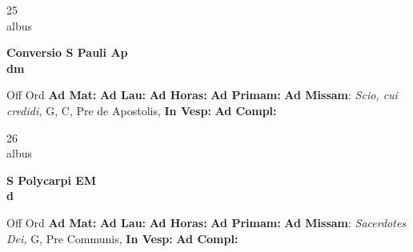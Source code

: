 \documentclass[10pt, openany]{book}
\begin{document}
    \begin{center}
        \begin{minipage}{3.5in}
            \vspace{2em}
            \begin{minipage}{0.5in}
                {\Huge 25} \\
                {\normalsize albus}
            \end{minipage}
            \begin{minipage}{3.0in}
                \textbf{ \large Conversio S Pauli Ap \\
                \textnormal{\normalsize dm}}

            \end{minipage}
            \begin{justify}Off Ord
                \textbf{Ad Mat: }
                \textbf{Ad Lau: }
                \textbf{Ad Horas: }
                \textbf{Ad Primam: }\textbf{Ad Missam}: \textit{Scio, cui credidi,} G, C, Pre de Apostolis, 
                \textbf{In Vesp: }
                \textbf{Ad Compl: }
            \end{justify}
        \end{minipage}
    \end{center}

    \begin{center}
        \begin{minipage}{3.5in}
            \vspace{2em}
            \begin{minipage}{0.5in}
                {\Huge 26} \\
                {\normalsize albus}
            \end{minipage}
            \begin{minipage}{3.0in}
                \textbf{ \large S Polycarpi EM \\
                \textnormal{\normalsize d}}

            \end{minipage}
            \begin{justify}Off Ord
                \textbf{Ad Mat: }
                \textbf{Ad Lau: }
                \textbf{Ad Horas: }
                \textbf{Ad Primam: }\textbf{Ad Missam}: \textit{Sacerdotes Dei,} G, Pre Communis, 
                \textbf{In Vesp: }
                \textbf{Ad Compl: }
            \end{justify}
        \end{minipage}
    \end{center}
\end{document}
